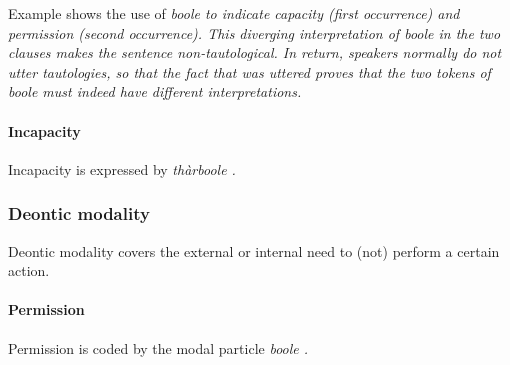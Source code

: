 Example  shows the use of \em boole \em to indicate capacity (first occurrence) and permission (second occurrence). This diverging interpretation of \em boole \em in the two clauses makes the sentence non-tautological. In return, speakers normally do not utter tautologies, so that the fact that  was uttered proves that the two tokens of \em boole \em must indeed have different interpretations.

\paragraph{Incapacity}\label{sec:func:Incapacity}
Incapacity is expressed  by \em thàrboole \em {}.










\subsubsection[Deontic]{Deontic modality}\label{sec:func:Deonticmodality}
Deontic modality covers the external or internal need to (not) perform a certain action.
  

\paragraph{Permission}\label{sec:func:Permission}
Permission is coded by the modal particle \em boole \em {} .

